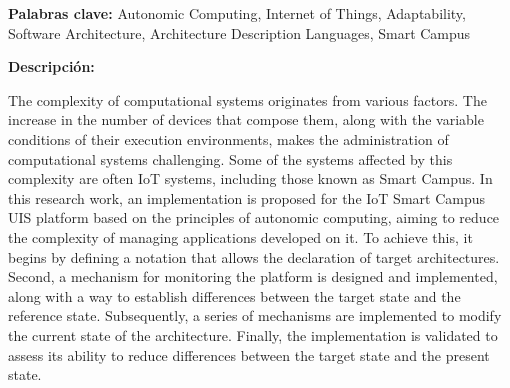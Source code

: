 \textbf{Palabras clave:} { Autonomic Computing, Internet of Things, Adaptability, \\Software Architecture, Architecture Description Languages, Smart Campus }

\textbf{Descripción:}

The complexity of computational systems originates from various factors. The increase in the number of devices that compose them, along with the variable conditions of their execution environments, makes the administration of computational systems challenging. Some of the systems affected by this complexity are often IoT systems, including those known as Smart Campus. In this research work, an implementation is proposed for the IoT Smart Campus UIS platform based on the principles of autonomic computing, aiming to reduce the complexity of managing applications developed on it. To achieve this, it begins by defining a notation that allows the declaration of target architectures. Second, a mechanism for monitoring the platform is designed and implemented, along with a way to establish differences between the target state and the reference state. Subsequently, a series of mechanisms are implemented to modify the current state of the architecture. Finally, the implementation is validated to assess its ability to reduce differences between the target state and the present state.

\newpage